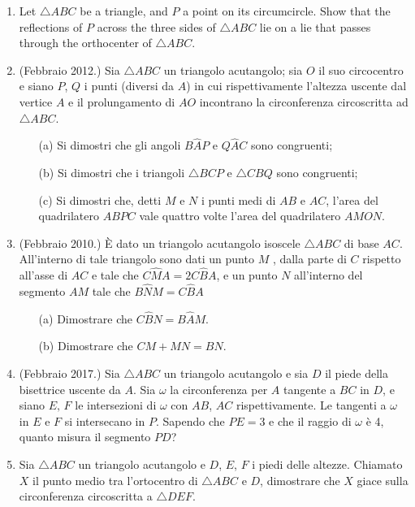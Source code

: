 \documentclass[a4paper]{article}
\theoremstyle{remark}
\theoremstyle{definition}
\begin{document}
\begin{enumerate}
\item  Let $ \triangle ABC $ be a triangle, and $ P $ a point on its circumcircle. Show that the reflections of $ P $ across the three sides of $ \triangle ABC $ lie on a lie that passes through the orthocenter of $ \triangle ABC $.

\item (Febbraio 2012.) Sia $\triangle ABC $ un triangolo acutangolo; sia $ O $ il suo circocentro e siano $ P $, $ Q $ i punti (diversi da $ A $) in cui rispettivamente l’altezza uscente dal vertice $ A $ e il prolungamento di $ AO $ incontrano la circonferenza circoscritta ad $ \triangle ABC $.
\begin{itemize}
	\item [(a)] Si dimostri che gli angoli $ B\hat{A}P $ e $ Q\hat{A}C $ sono congruenti;
	\item [(b)] Si dimostri che i triangoli $ \triangle BCP $ e $ \triangle CBQ $ sono congruenti;
	\item [(c)] Si dimostri che, detti $ M $ e $ N $ i punti medi di $ AB $ e $ AC $, l’area del quadrilatero $ ABPC $ vale quattro volte l’area del quadrilatero $ AMON $.
\end{itemize}

\item (Febbraio 2010.) È dato un triangolo acutangolo isoscele $ \triangle ABC $ di base $ AC $. All’interno di tale triangolo sono dati un punto $ M $ , dalla parte di $ C $ rispetto all’asse di $ AC $ e tale che $ C\hat{M}A = 2 C\hat{B}A $, e un punto $ N  $ all’interno del segmento $ AM $ tale che $ B\hat{N}M = C\hat{B}A $
\begin{itemize}
	\item [(a)] Dimostrare che $ C\hat{B}N = B\hat{A}M  $.
	\item [(b)] Dimostrare che $ CM + MN = BN $. 
\end{itemize}

\item (Febbraio 2017.) Sia $ \triangle ABC $ un triangolo acutangolo e sia $ D $ il piede della bisettrice uscente da $ A $. Sia $ \omega $ la circonferenza per $ A $ tangente a $ BC $ in $ D $, e siano $ E,\, F $ le intersezioni di $ \omega $ con $ AB $, $ AC $ rispettivamente. Le tangenti a $ \omega $ in $ E $ e $ F $ si intersecano in $ P $. Sapendo che $ PE = 3$ e che il raggio di $ \omega $ è 4, quanto misura il segmento $PD$? 

\item Sia $\triangle ABC $ un triangolo acutangolo e $ D $, $ E $, $ F $ i piedi delle altezze. Chiamato $ X $ il punto medio tra l'ortocentro di $ \triangle ABC $ e $ D $, dimostrare che $ X $ giace sulla circonferenza circoscritta a $\triangle DEF $.


\end{enumerate}
\end{document}
